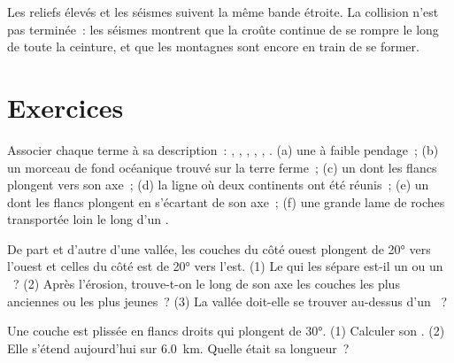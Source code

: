Les reliefs élevés et les séismes suivent la même bande étroite. La
collision n'est pas terminée~: les séismes montrent que la croûte continue
de se rompre le long de toute la ceinture, et que les montagnes sont encore
en train de se former.

\section{Exercices}

\begin{exercise}[$\star$]\label{exo:g12:mountain-building:1}
Associer chaque terme à sa description~: , ,
, , , . (a) une  à faible pendage~; (b) un morceau de fond océanique trouvé sur la
terre ferme~; (c) un  dont les flancs plongent vers son axe~; (d) la
ligne où deux continents ont été réunis~; (e) un  dont les flancs
plongent en s'écartant de son axe~; (f) une grande lame de roches
transportée loin le long d'un .
\end{exercise}

\begin{exercise}[$\star$]\label{exo:g12:mountain-building:2}
De part et d'autre d'une vallée, les couches du côté ouest plongent de
\ang{20} vers l'ouest et celles du côté est de \ang{20} vers l'est. (1) Le
 qui les sépare est-il un  ou un ~? (2) Après
l'érosion, trouve-t-on le long de son axe les couches les plus anciennes ou
les plus jeunes~? (3) La vallée doit-elle se trouver au-dessus d'un
~?
\end{exercise}

\begin{exercise}[$\star$]\label{exo:g12:mountain-building:3}
Une couche est plissée en flancs droits qui plongent de \ang{30}.
(1) Calculer son . (2) Elle s'étend aujourd'hui sur
\qty{6.0}{km}. Quelle était sa longueur~?
\end{exercise}

